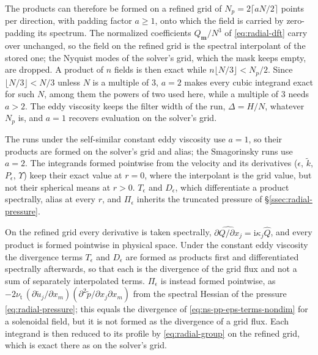 \documentclass{article}
\begin{document}
The products can therefore be formed on a refined grid of
$N_p = 2 \lceil a N / 2 \rceil$ points per direction, with padding factor
$a \ge 1$, onto which the field is carried by zero-padding its spectrum. The
normalized coefficients $\hat Q_{\mathbf{m}}/N^3$ of \eqref{eq:radial-dft}
carry over unchanged, so the field on the refined grid is the spectral
interpolant of the stored one; the Nyquist modes of the solver's grid, which
the mask keeps empty, are dropped. A product of $n$ fields is then exact while
$n \lfloor N/3 \rfloor < N_p/2$. Since $\lfloor N/3 \rfloor < N/3$ unless $N$
is a multiple of $3$, $a = 2$ makes every cubic integrand exact for such $N$,
among them the powers of two used here, while a multiple of $3$ needs
$a > 2$. The eddy viscosity keeps the filter width of the run,
$\Delta = H/N$, whatever $N_p$ is, and $a = 1$ recovers evaluation on the
solver's grid.

The runs under the self-similar constant eddy viscosity use $a = 1$, so their
products are formed on the solver's grid and alias; the Smagorinsky runs use
$a = 2$. The integrands formed pointwise from the velocity and its derivatives
($\epsilon$, $\tilde k$, $P_\epsilon$, $\Upsilon$) keep their exact value at
$r = 0$, where the interpolant is the grid value, but not their spherical
means at $r > 0$. $T_\epsilon$ and $D_\epsilon$, which differentiate a product
spectrally, alias at every $r$, and $\Pi_\epsilon$ inherits the truncated
pressure of \S\ref{ssec:radial-pressure}.

On the refined grid every derivative is taken spectrally,
$\widehat{\partial Q/\partial x_j} = \mathrm{i} \kappa_j \hat Q$, and every product
is formed pointwise in physical space. Under the constant eddy viscosity the
divergence terms $T_\epsilon$ and $D_\epsilon$ are formed as products first and
differentiated spectrally afterwards, so that each is the divergence of the
grid flux and not a sum of separately interpolated terms. $\Pi_\epsilon$ is instead formed pointwise, as
$-2\nu_{\mathrm{t}}\, (\partial \tilde u_j / \partial x_m)
(\partial^2 \tilde p / \partial x_j \partial x_m)$ from the spectral Hessian of
the pressure \eqref{eq:radial-pressure}; this equals the divergence of
\eqref{eq:ns-pp-eps-terms-nondim} for a solenoidal field, but it is not
formed as the divergence of a grid flux. Each integrand is then reduced to its
profile by \eqref{eq:radial-group} on the refined grid, which is exact there
as on the solver's grid.
\end{document}
